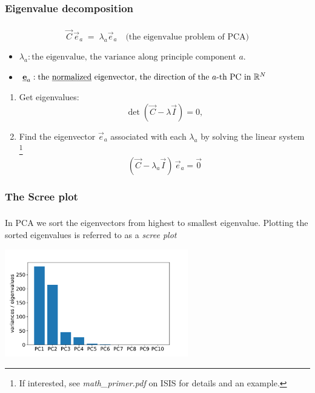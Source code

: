 \subsubsection{Eigenvalue decomposition}

\begin{frame}\frametitle{\subsubsecname}

\begin{equation}
\vec C \, \vec e_a \; = \; \lambda_a \vec e_a  \quad\text{(the eigenvalue problem of PCA)}
\end{equation}

\begin{itemize}
\item[] $\lambda_a: \text{the eigenvalue, the variance along principle component } a.$
\item[] $\underline{\mathbf{e}}_a: \text{the \underline{normalized} eigenvector, the direction of the } a\text{-th PC in } \mathbb{R}^N$
\end{itemize}


\pause

\begin{enumerate}
\item Get eigenvalues:
\begin{equation}\det(\vec C-\lambda \vec I) = 0,
\end{equation} 
\item Find the eigenvector $\vec e_a$ associated with each $\lambda_a$ by solving the linear system
\footnote{If interested, see {\emph{math\_primer.pdf} on ISIS} for details and an example.}
\begin{equation}(\vec C - \lambda_a \vec I )\, \vec e_a = \vec 0
\end{equation}
\end{enumerate}

\end{frame}

\subsubsection{The Scree plot}

\begin{frame}\frametitle{\subsubsecname}

In PCA we sort the eigenvectors from highest to smallest eigenvalue.
Plotting the sorted eigenvalues is referred to as a \emph{scree plot}

\begin{center}
\includegraphics[width=0.6\textwidth]{img/screeplot_kpca_poly_d3}%
\end{center}

\end{frame}

